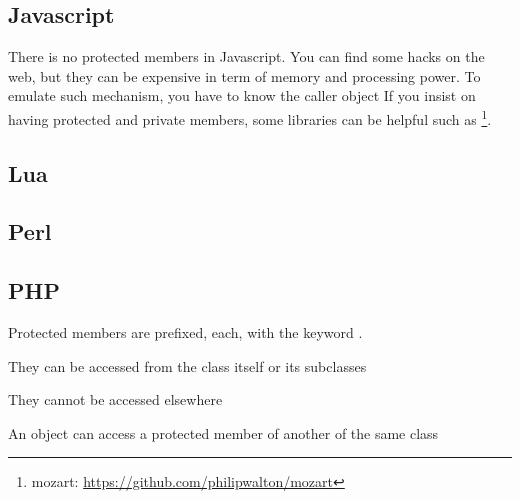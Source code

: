 \documentclass{KodeBook}
\begin{document}
\subsection{Javascript} 

There is no protected members in Javascript. 
You can find some hacks on the web, but they can be expensive in term of memory and processing power.
To emulate such mechanism, you have to know the caller object 
If you insist on having protected and private members, some libraries can be helpful such as \footnote{mozart: \url{https://github.com/philipwalton/mozart}}.


\subsection{Lua}


\subsection{Perl}

%

\subsection{PHP}

Protected members are prefixed, each, with the keyword .



They can be accessed from the class itself or its subclasses



They cannot be accessed elsewhere



An object can access a protected member of another of the same class
\end{document}
